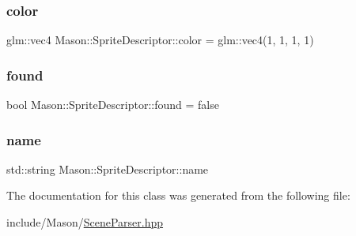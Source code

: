 \subsubsection{\texorpdfstring{color}{color}}
{\footnotesize\ttfamily glm\+::vec4 Mason\+::\+Sprite\+Descriptor\+::color = glm\+::vec4(1, 1, 1, 1)}

\hypertarget{class_mason_1_1_sprite_descriptor_a28d5738152a1b83f32846de399ccc4e5}{}\label{class_mason_1_1_sprite_descriptor_a28d5738152a1b83f32846de399ccc4e5} 
\subsubsection{\texorpdfstring{found}{found}}
{\footnotesize\ttfamily bool Mason\+::\+Sprite\+Descriptor\+::found = false}

\hypertarget{class_mason_1_1_sprite_descriptor_a78875744bb1e7ba41d6a35ccf83ba43c}{}\label{class_mason_1_1_sprite_descriptor_a78875744bb1e7ba41d6a35ccf83ba43c} 
\subsubsection{\texorpdfstring{name}{name}}
{\footnotesize\ttfamily std\+::string Mason\+::\+Sprite\+Descriptor\+::name}



The documentation for this class was generated from the following file\+:\begin{DoxyCompactItemize}
\item 
include/\+Mason/\hyperlink{_scene_parser_8hpp}{Scene\+Parser.\+hpp}\end{DoxyCompactItemize}
